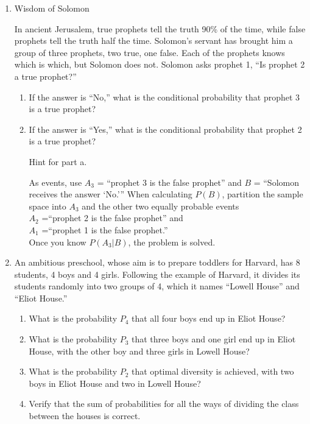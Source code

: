 \documentclass[12pt]{article}
\begin{document}
\begin{enumerate}
\item Wisdom of Solomon

In ancient Jerusalem, true prophets tell the truth 90\% of the time, while false prophets tell the truth half the time. Solomon's servant has brought him a group of three prophets, two true, one false. Each of the prophets knows which is which, but Solomon does not. Solomon asks prophet 1, ``Is prophet 2 a true prophet?''

\begin{enumerate} \item If the answer is ``No,'' what is the conditional probability that prophet 3 is a true prophet? 


\item If the answer is ``Yes,'' what is the conditional probability that prophet 2 is a true prophet? 

Hint for part a. 

As events, use $A_3$ = ``prophet 3 is the false prophet'' and $B$ = ``Solomon receives the answer `No.''' When calculating $P(B)$, partition the sample space into $A_3$ and the other two equally probable events\\ $A_2$ =``prophet 2 is the false prophet'' and\\ $A_1$ =``prophet 1 is the false prophet.''\\ Once you know $P(A_3|B)$, the problem is solved.

\end{enumerate}
\item An ambitious preschool, whose aim is to prepare toddlers for
Harvard, has 8 students, 4 boys and 4 girls.  Following the
example of Harvard, it divides its students randomly into two
groups of 4, which it names ``Lowell House'' and ``Eliot House.''
\begin{enumerate}
\item What is the probability $P_4$ that all four boys end up in
Eliot House?

\item What is the probability $P_3$ that three boys and one girl
end up in Eliot House, with the other boy and three girls in
Lowell House?

\item What is the probability $P_2$ that optimal diversity is
achieved, with two boys in Eliot House and two in Lowell House?

\item Verify that the sum of probabilities for all the ways of
dividing the class between the houses is correct.


\end{enumerate}
\end{enumerate}
\end{document}
